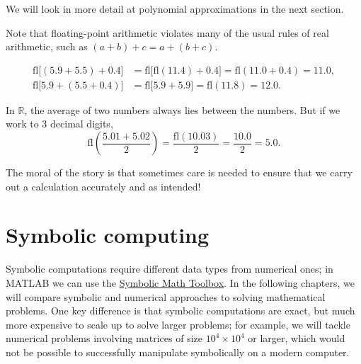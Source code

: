 \documentclass[
  letterpaper,
  DIV=11,
  numbers=noendperiod]{scrreprt}
\begin{document}
\begin{tcolorbox}[enhanced jigsaw, toptitle=1mm, breakable, colbacktitle=quarto-callout-note-color!10!white, colback=white, opacitybacktitle=0.6, rightrule=.15mm, bottomrule=.15mm, left=2mm, arc=.35mm, bottomtitle=1mm, title=\textcolor{quarto-callout-note-color}{\faInfo}\hspace{0.5em}{Note}, titlerule=0mm, toprule=.15mm, leftrule=.75mm, opacityback=0, colframe=quarto-callout-note-color-frame, coltitle=black]

We will look in more detail at polynomial approximations in the next
section.

\end{tcolorbox}

Note that floating-point arithmetic violates many of the usual rules of
real arithmetic, such as \((a+b)+c = a + (b+c)\).

\[
\begin{aligned}
\mathrm{fl}\big[(5.9 + 5.5) + 0.4\big] &= \mathrm{fl}\big[\mathrm{fl}(11.4) + 0.4\big] = \mathrm{fl}(11.0 + 0.4) = 11.0,\\
\mathrm{fl}\big[5.9 + (5.5 + 0.4)\big] &= \mathrm{fl}\big[5.9 + 5.9 \big] = \mathrm{fl}(11.8) = 12.0.
\end{aligned}
\]

In \(\mathbb{R}\), the average of two numbers always lies between the
numbers. But if we work to 3 decimal digits, \[
\mathrm{fl}\left(\frac{5.01 + 5.02}{2}\right) = \frac{\mathrm{fl}(10.03)}{2} = \frac{10.0}{2} = 5.0.
\]

The moral of the story is that sometimes care is needed to ensure that
we carry out a calculation accurately and as intended!

\section{Symbolic computing}\label{symbolic-computing}

Symbolic computations require different data types from numerical ones;
in MATLAB we can use the
\href{https://uk.mathworks.com/help/symbolic/symbolic-computations-in-matlab.html}{Symbolic
Math Toolbox}. In the following chapters, we will compare symbolic and
numerical approaches to solving mathematical problems. One key
difference is that symbolic computations are exact, but much more
expensive to scale up to solve larger problems; for example, we will
tackle numerical problems involving matrices of size
\(10^4 \times 10^4\) or larger, which would not be possible to
successfully manipulate symbolically on a modern computer.
\end{document}
